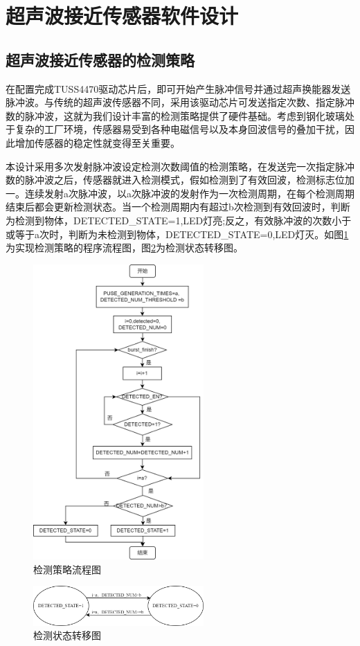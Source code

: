 \newpage
\section{超声波接近传感器软件设计}
\subsection{超声波接近传感器的检测策略}
在配置完成TUSS4470驱动芯片后，即可开始产生脉冲信号并通过超声换能器发送脉冲波。与传统的超声波传感器不同，采用该驱动芯片可发送指定次数、指定脉冲数的脉冲波，这就为我们设计丰富的检测策略提供了硬件基础。考虑到钢化玻璃处于复杂的工厂环境，传感器易受到各种电磁信号以及本身回波信号的叠加干扰，因此增加传感器的稳定性就变得至关重要。\par

本设计采用多次发射脉冲波设定检测次数阈值的检测策略，在发送完一次指定脉冲数的脉冲波之后，传感器就进入检测模式，假如检测到了有效回波，检测标志位加一。连续发射a次脉冲波，以a次脉冲波的发射作为一次检测周期，在每个检测周期结束后都会更新检测状态。当一个检测周期内有超过b次检测到有效回波时，判断为检测到物体，DETECTED\_STATE=1,LED灯亮;反之，有效脉冲波的次数小于或等于a次时，判断为未检测到物体，DETECTED\_STATE=0,LED灯灭。如图\ref{检测策略流程图}为实现检测策略的程序流程图，图\ref{检测状态转移图}为检测状态转移图。
\begin{figure}[!h]
	\centering
	\includegraphics[width=6.5cm]{figure/detection logic.png}
	\caption{检测策略流程图}
	\label{检测策略流程图}%
\end{figure}
\begin{figure}[!h]
	\centering
	\includegraphics[width=6.5cm]{figure/LED state transition diagram.png}
	\caption{检测状态转移图}
	\label{检测状态转移图}%
\end{figure}\par


